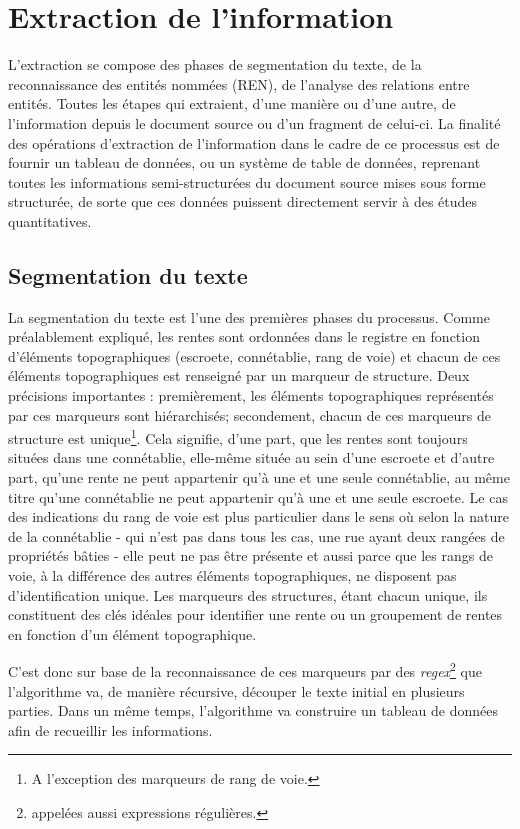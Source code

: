 \section{Extraction de l'information}
L'extraction se compose des phases de segmentation du texte, de la reconnaissance des entités nommées (REN), de l'analyse des relations entre entités. Toutes les étapes qui extraient, d'une manière ou d'une autre, de l'information depuis le document source ou d'un fragment de celui-ci. 
La finalité des opérations d'extraction de l'information dans le cadre de ce processus est de fournir un tableau de données, ou un système de table de données, reprenant toutes les informations semi-structurées du document source mises sous forme structurée, de sorte que ces données puissent directement servir à des études quantitatives.

\subsection{Segmentation du texte}
La segmentation du texte est l'une des premières phases du processus. Comme préalablement expliqué, les rentes sont ordonnées dans le registre en fonction d'éléments topographiques (escroete, connétablie, rang de voie) et chacun de ces éléments topographiques est renseigné par un marqueur de structure. Deux précisions  importantes : premièrement, les éléments topographiques représentés par ces marqueurs sont hiérarchisés; secondement, chacun de ces marqueurs de structure est unique\footnote{A l'exception des marqueurs de rang de voie.}.
Cela signifie, d'une part, que les rentes sont toujours situées dans une connétablie, elle-même située au sein d'une escroete et d’autre part, qu'une rente ne peut appartenir qu'à une et une seule connétablie, au même titre qu'une connétablie ne peut appartenir qu'à une et une seule escroete.
Le cas des indications du rang de voie est plus particulier dans le sens où selon la nature de la connétablie - qui n'est pas dans tous les cas, une rue ayant deux rangées de propriétés bâties - elle peut ne pas être présente et aussi parce que les rangs de voie, à la différence des autres éléments topographiques, ne disposent pas d'identification unique.
Les marqueurs des structures, étant chacun unique, ils constituent des clés idéales pour identifier une rente ou un groupement de rentes en fonction d'un élément topographique. 

C'est donc sur base de la reconnaissance de ces marqueurs par des \textit{regex}\footnote{appelées aussi \og expressions régulières\fg{}.} que l'algorithme va, de manière récursive, découper le texte initial en plusieurs parties. Dans un même temps, l'algorithme va construire un tableau de données afin de  recueillir les informations. 

